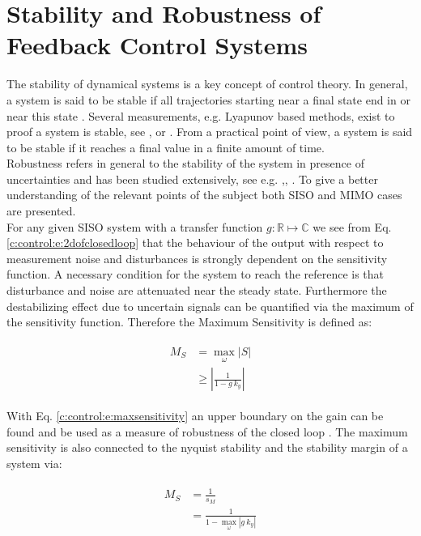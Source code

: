 \section{Stability and Robustness of Feedback Control Systems}
\label{c:control:s:robustness}

The stability of dynamical systems is a key concept of control theory. In general, a system is said to be stable if all trajectories starting near a final state end in or near this state \cite[p.10]{Adamy2014}. Several measurements, e.g. Lyapunov based methods, exist to proof a system is stable, see \cite{Lunze2016},\cite{Lunze2014} or \cite{Adamy2014}. From a practical point of view, a system is said to be stable if it reaches a final value in a finite amount of time.\\ 

Robustness refers in general to the stability of the system in presence of uncertainties and has been studied extensively, see e.g. \cite{Zhou1998},\cite{Zhou1996}, \cite{Doyle}.
To give a better understanding of the relevant points of the subject both SISO and MIMO cases are presented. \\

For any given SISO system with a transfer function $g : \mathbb{R} \mapsto \mathbb{C}$ we see from Eq. \ref{c:control:e:2dofclosedloop} that the behaviour of the output with respect to measurement noise and disturbances is strongly dependent on the sensitivity function. A necessary condition for the system to reach the reference is that disturbance and noise are attenuated  near the steady state. Furthermore the destabilizing effect due to uncertain signals can be quantified via the maximum of the sensitivity function. Therefore the Maximum Sensitivity is defined as:

\begin{align}
\begin{split}
M_S & = \max_\omega \left| S \right| \\
& \geq \left| \frac{1}{1 - g~k_y}\right|
\end{split}
\label{c:control:e:maxsensitivity}
\end{align}

With Eq. \ref{c:control:e:maxsensitivity} an upper boundary on the gain can be found and be used as a measure of robustness of the closed loop \cite[p.323 ff.]{Astrom2009}. The maximum sensitivity is also connected to the nyquist stability and the stability margin of a system via:

\begin{align}
\begin{split}
M_S &= \frac{1}{s_M} \\
&= \frac{1}{1 - \max_\omega \left| g ~k_y \right|}
\end{split}
\label{c:control:e:maxsensitivitynyquist}
\end{align}

